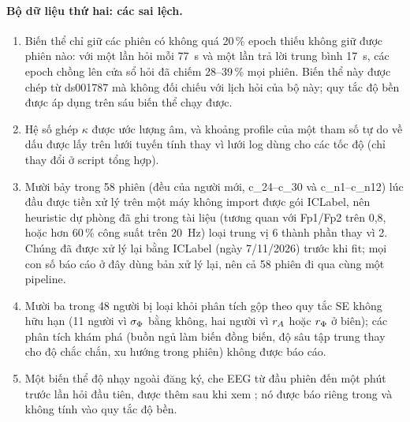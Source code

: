 \paragraph{Bộ dữ liệu thứ hai: các sai lệch.}
\begin{enumerate}[label=(\roman*)]
  \item Biến thể chỉ giữ các phiên có không quá 20\,\% epoch thiếu không giữ được phiên nào: với một lần hỏi mỗi 77~s và một lần trả lời trung bình 17~s, các epoch chồng lên cửa sổ hỏi đã chiếm 28--39\,\% mọi phiên. Biến thể này được chép từ ds001787 mà không đối chiếu với lịch hỏi của bộ này; quy tắc độ bền được áp dụng trên sáu biến thể chạy được.
  \item Hệ số ghép $\kappa$ được ước lượng âm, và khoảng profile của một tham số tự do về dấu được lấy trên lưới tuyến tính thay vì lưới log dùng cho các tốc độ (chỉ thay đổi ở script tổng hợp).
  \item Mười bảy trong 58 phiên (đều của người mới, c\_24--c\_30 và c\_n1--c\_n12) lúc đầu được tiền xử lý trên một máy không import được gói ICLabel, nên heuristic dự phòng đã ghi trong tài liệu (tương quan với Fp1/Fp2 trên 0,8, hoặc hơn 60\,\% công suất trên 20~Hz) loại trung vị 6 thành phần thay vì 2. Chúng đã được xử lý lại bằng ICLabel (ngày 7/11/2026) trước khi fit; mọi con số báo cáo ở đây dùng bản xử lý lại, nên cả 58 phiên đi qua cùng một pipeline.
  \item Mười ba trong 48 người bị loại khỏi phân tích gộp theo quy tắc SE không hữu hạn (11 người vì $\sigma_{\Phi}$ bằng không, hai người vì $r_{A}$ hoặc $r_{\Phi}$ ở biên); các phân tích khám phá (buồn ngủ làm biến đồng biến, độ sâu tập trung thay cho độ chắc chắn, xu hướng trong phiên) không được báo cáo.
  \item Một biến thể độ nhạy ngoài đăng ký, che EEG từ đầu phiên đến một phút trước lần hỏi đầu tiên, được thêm sau khi xem ; nó được báo riêng trong  và không tính vào quy tắc độ bền.
\end{enumerate}

